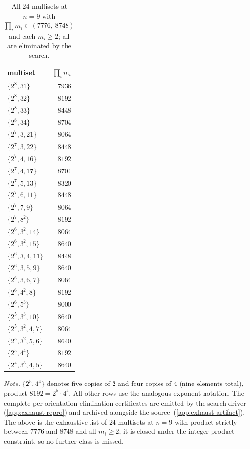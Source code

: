 \documentclass[11pt,a4paper]{article}
\theoremstyle{plain}
\theoremstyle{definition}
\begin{document}
\begin{table}[ht]
\centering
\small
\caption{All $24$ multisets at $n = 9$ with $\prod_i m_i \in (7776,\,
8748)$ and each $m_i \ge 2$; all are eliminated by the
search.}\label{tab:n9-strict-between}
\begin{tabular}{l r}
\toprule
multiset & $\prod_i m_i$\\\midrule
$\{2^8, 31\}$                   & $7936$\\
$\{2^8, 32\}$                   & $8192$\\
$\{2^8, 33\}$                   & $8448$\\
$\{2^8, 34\}$                   & $8704$\\
$\{2^7, 3, 21\}$                & $8064$\\
$\{2^7, 3, 22\}$                & $8448$\\
$\{2^7, 4, 16\}$                & $8192$\\
$\{2^7, 4, 17\}$                & $8704$\\
$\{2^7, 5, 13\}$                & $8320$\\
$\{2^7, 6, 11\}$                & $8448$\\
$\{2^7, 7, 9\}$                 & $8064$\\
$\{2^7, 8^2\}$                  & $8192$\\
$\{2^6, 3^2, 14\}$              & $8064$\\
$\{2^6, 3^2, 15\}$              & $8640$\\
$\{2^6, 3, 4, 11\}$             & $8448$\\
$\{2^6, 3, 5, 9\}$              & $8640$\\
$\{2^6, 3, 6, 7\}$              & $8064$\\
$\{2^6, 4^2, 8\}$               & $8192$\\
$\{2^6, 5^3\}$                  & $8000$\\
$\{2^5, 3^3, 10\}$              & $8640$\\
$\{2^5, 3^2, 4, 7\}$            & $8064$\\
$\{2^5, 3^2, 5, 6\}$            & $8640$\\
$\{2^5, 4^4\}$                  & $8192$\\
$\{2^4, 3^3, 4, 5\}$            & $8640$\\
\bottomrule
\end{tabular}

\medskip
\textit{Note.} $\{2^5, 4^4\}$ denotes five copies of $2$ and four
copies of $4$ (nine elements total), product $8192 = 2^5 \cdot 4^4$.
All other rows use the analogous exponent notation.  The complete
per-orientation
elimination certificates are emitted by the search driver
(\cref{app:exhaust-repro}) and archived alongside the
source~(\cref{app:exhaust-artifact}).  The above is the exhaustive
list of $24$ multisets at $n = 9$ with product strictly between
$7776$ and $8748$ and all $m_i \ge 2$; it is closed under the
integer-product constraint, so no further class is missed.
\end{table}
\end{document}
